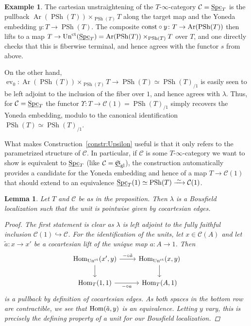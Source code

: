 \documentclass[reqno]{memo-l}
\theoremstyle{mythm}
\newtheorem{lemma}[thm]{Lemma}
\theoremstyle{definition}
\newtheorem{ex}[thm]{Example}
\numberwithin{equation}{section}
\newcommand{\Cc}{{\mathcal{C}}}
\newcommand{\gl}{\textup{gl}}
\DeclareMathOperator{\ev}{ev}
\DeclareMathOperator{\Spc}{Spc}
\renewcommand{\hom}{\textup{hom}}
\DeclareMathOperator{\PSh}{PSh}
\DeclareMathOperator{\Ar}{Ar}
\renewcommand{\hom}{{\textup{Hom}}}
\newcommand{\const}{\textup{const}}
\newcommand{\ct}{\textup{ct}}
\newcommand{\Un}{\textup{Un}}
\newcommand{\ulhelper}[2]{\underline{\setbox0=\hbox{$#1#2$}\dp0=0.4pt \box0\relax}}
\newcommand{\ul}[1]{{\mathpalette\ulhelper{#1}}\hbox{\rule[-2pt]{0pt}{0pt}}}
\newcommand{\iso}{\xrightarrow{\;\smash{\raisebox{-0.25ex}{\ensuremath{\scriptstyle\sim}}}\;}}
\newcommand{\myS}{{{\mathfrak S\kern-.4pt}}}
\begin{document}
\begin{ex}
    The cartesian unstraightening of the $T$-$\infty$-category $\Cc=\ul\Spc_T$ is the pullback $\Ar(\PSh(T))\times_{\PSh(T)}T$ along the target map and the Yoneda embedding $y\colon T\to\PSh(T)$. The composite $\const\circ y\colon T\to\Ar(\PSh(T))$ then lifts to a map $T\to\Un^\ct(\ul\Spc_T)=\Ar(\PSh(T))\times_{\PSh(T)}T$ over $T$, and one directly checks that this is fiberwise terminal, and hence agrees with the functor $s$ from above.
    
    On the other hand, $\ev_0\colon\Ar(\PSh(T))\times_{\PSh(T)}T\to\PSh(T)\simeq\PSh(T)_{/1}$ is easily seen to be left adjoint to the inclusion of the fiber over $1$, and hence agrees with $\lambda$. Thus, for $\Cc=\ul\Spc_T$ the functor $\Upsilon\colon T\to\Cc(1)=\PSh(T)_{/1}$ simply recovers the Yoneda embedding, modulo to the canonical identification $\PSh(T)\simeq\PSh(T)_{/1}$.

    What makes Construction~\ref{constr:Upsilon} useful is that it only refers to the parametrized structure of $\Cc$. In particular, if $\Cc$ is some $T$-$\infty$-category we want to show is equivalent to $\ul\Spc_T$ (like $\Cc=\ul\myS_\gl$), the construction automatically provides a candidate for the Yoneda embedding and hence of a map $T\to\Cc(1)$ that should extend to an equivalence $\ul\Spc_T(1)\simeq\PSh(T)\iso\Cc(1)$.
\end{ex}

\begin{lemma}
    Let $T$ and $\Cc$ be as in the proposition. Then $\lambda$ is a Bousfield localization such that the unit is pointwise given by cocartesian edges.
    \begin{proof}
        The first statement is clear as $\lambda$ is left adjoint to the fully faithful inclusion $\Cc(1)\hookrightarrow\Cc$. For the identification of the units, let $x\in\Cc(A)$ and let $\tilde a\colon x\to x'$ be a cocartesian lift of the unique map $a\colon A\to 1$. Then
        \[
            \begin{tikzcd}
                \hom_{\Un^\ct}(x',y)\arrow[d]\arrow[r, "-\circ\tilde a"] & \hom_{\Un^\ct}(x,y)\arrow[d]\\
                \hom_T(1,1)\arrow[r, "-\circ a"']&\hom_T(A,1)
            \end{tikzcd}
        \]
        is a pullback by definition of cocartesian edges. As both spaces in the bottom row are contractible, we see that $\hom(\tilde a,y)$ is an equivalence. Letting $y$ vary, this is precisely the defining property of a unit for our Bousfield localization.
    \end{proof}
\end{lemma}
\end{document}
